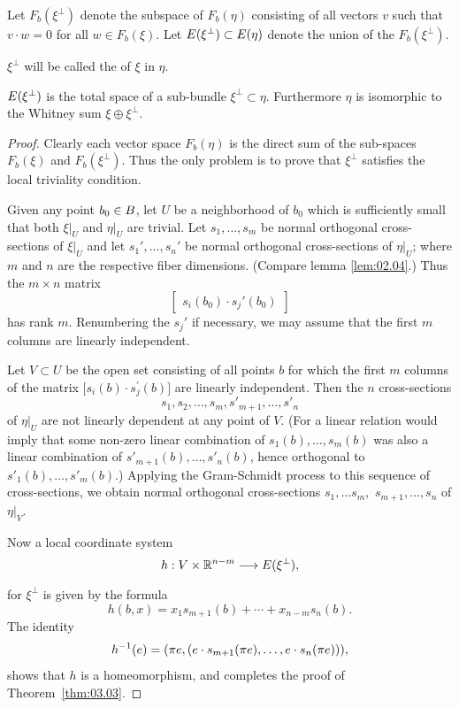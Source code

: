 \documentclass[../main]{subfiles}
\begin{document}
Let $F_b(\xi^\perp)$ denote the subspace of $F_b(\eta)$ consisting of all vectors $v$ such that $v \cdot w = 0$ for all $w \in F_b(\xi)$. Let $E(\xi^\perp) \subset E(\eta)$ denote the union of the $F_b(\xi^\perp)$.


\begin{definition}\label{def:03.03}
$\xi^\perp$ will be called the  of $\xi$ in $\eta$.
\end{definition} %


\begin{theorem}\label{thm:03.03}
	$E(\xi^\perp)$ is the total space of a sub-bundle
	$\xi^\perp\subset\eta$. Furthermore $\eta$ is isomorphic to the Whitney sum $\xi\oplus\xi^\perp$.
\end{theorem}


\begin{proof}
Clearly each vector space $F_b(\eta)$ is the direct sum of the sub-spaces $F_b(\xi)$ and $F_b(\xi^\perp)$. Thus the only problem is to prove that $\xi^\perp$ satisfies the local triviality condition.

Given any point $b_0 \in B$, let $U$ be a neighborhood of $b_0$ which is sufficiently small that both $\xi|_U$ and $\eta|_U$ are trivial. Let $s_1, \dots, s_m$ be normal orthogonal cross-sections of $\xi|_U$ and let $s_1 ', \dots, s_n '$ be normal orthogonal cross-sections of $\eta|_U$; where $m$ and $n$ are the respective fiber dimensions. (Compare lemma \ref{lem:02.04}.) Thus the $m\times n$ matrix 
\[
\begin{bmatrix}
s_i (b_0) \cdot s_j ' (b_0)
\end{bmatrix}
\]
has rank $m$. Renumbering the $s_j '$ if necessary, we may assume that the first $m$ columns are linearly independent.

Let $V\subset U$ be the open set consisting of all points $b$ for which the first $m$ columns of the matrix $\big[s_{i}(b) \cdot s_{j}^{\prime}(b)\big]$  are linearly independent. Then the $n$ cross-sections
\[
s_1, s_2, \dots, s_m, s'_{m+1},\dots,s'_n
\] 
of $\eta|_U$ are not linearly dependent at any point of $V$. (For a linear relation would imply that some non-zero linear combination of $s_1 (b),\dots, s_m (b)$ was also a linear combination of $s'_{m+1} (b),\dots,s'_n (b)$, hence orthogonal to $s'_1 (b),\dots, s'_m (b)$.) Applying the Gram-Schmidt process to this sequence of
cross-sections, we obtain normal orthogonal cross-sections $s_1, \dots s_m,$ $s_{m+1},\dots,s_n$ of $\eta|_V$.

Now a local coordinate system
\[
h : V \times \bR^{n-m}\varrightarrow{} \total(\xi^\perp),
\]
for $\xi^\perp$ is given by the formula
\[
h(b, x)=x_{1} s_{m+1}(b)+\cdots+x_{n-m} s_{n}(b).
\]
The identity
\[
h^{-1} (e)=
(\pi e,(e \cdot s_{m+1}(\pi e), \dots, e \cdot s_{n}(\pi e))),
\]
shows that $h$ is a homeomorphism, and completes the proof of Theorem~\ref{thm:03.03}.
\end{proof}
\end{document}
